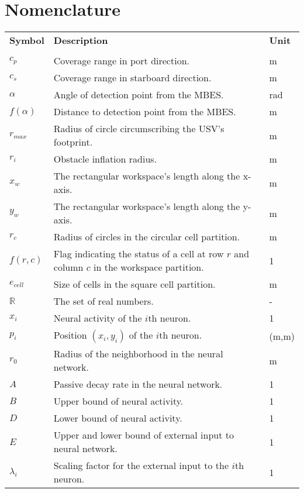 \chapter*{Nomenclature}

\noindent 
\begin{center}
\begin{longtable}{ p{} p{} p{} }
	\textbf{Symbol} & \textbf{Description} & \textbf{Unit} \\\\
	$c_p$ & Coverage range in port direction. & m \\
	$c_s$ & Coverage range in starboard direction. & m \\
	$\alpha$ & Angle of detection point from the MBES. & rad \\
	$f(\alpha)$ & Distance to detection point from the MBES. & m \\	
	$r_{max}$ & Radius of circle circumscribing the USV's footprint. & m \\
	$r_i$ & Obstacle inflation radius. & m \\
	$x_w$ & The rectangular workspace's length along the x-axis. & m \\
	$y_w$ & The rectangular workspace's length along the y-axis. & m \\
	$r_c$ & Radius of circles in the circular cell partition. & m \\
	$f(r,c)$ & Flag indicating the status of a cell at row $r$ and column $c$ in the workspace partition. & 1 \\
	$e_{cell}$ & Size of cells in the square cell partition. & m \\
	$\mathbb{R}$ & The set of real numbers. & - \\
	$x_i$ & Neural activity of the $i$th neuron. & 1 \\
	$p_i$ & Position $(x_i,y_i)$ of the $i$th neuron. & (m,m) \\
	$r_0$ & Radius of the neighborhood in the neural network. & m \\
	$A$ & Passive decay rate in the neural network. & 1 \\
	$B$ & Upper bound of neural activity. & 1 \\
	$D$ & Lower bound of neural activity. & 1 \\
	$E$ & Upper and lower bound of external input to neural network. & 1\\
	$\lambda_i$ & Scaling factor for the external input to the $i$th neuron. & 1 \\

\end{longtable}
\end{center}
